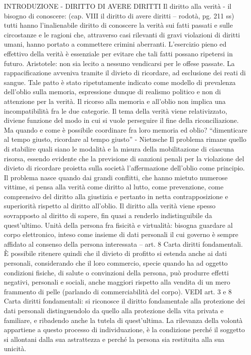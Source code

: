 {INTRODUZIONE - DIRITTO DI AVERE DIRITTI}
Il diritto alla verità - il bisogno di conoscere: (cap. VIII il diritto di avere diritti – rodotà, pg. 211 ss)
tutti hanno l’inalienabile diritto di conoscere la verità sui fatti passati e sulle circostanze e le ragioni che, attraverso casi rilevanti di gravi violazioni di diritti umani, hanno portato a commettere crimini aberranti. L’esercizio pieno ed effettivo della verità è essenziale per evitare che tali fatti possano ripetersi in futuro.
Aristotele: non sia lecito a nessuno vendicarsi per le offese passate. La rappacificazione avveniva tramite il divieto di ricordare, ad esclusione dei reati di sangue.
Tale patto è stato ripetutamente indicato come modello di prevalenza dell’oblio sulla memoria, espressione dunque di realismo politico e non di attenzione per la verità. Il ricorso alla memoria e all’oblio non implica una incompatibilità fra le due categorie. Il tema della verità viene relativizzato, diviene funzione del modo in cui si vuole perseguire il fine della riconciliazione. Ma quando e come è possibile coordinare fra loro memoria ed oblio?
“dimenticare al tempo giusto, ricordare al tempo giusto”  - Nietzsche
Il problema rimane quello di stabilire quali siano le modalità e la misura della mobilitazione di ciascuna risorsa, essendo evidente che la previsione di sanzioni penali per la violazione del divieto di ricordare proietta sulla società l’affermazione dell’oblio come principio.
Il problema nasce quando dai grandi conflitti, che hanno mietuto numerose vittime, si pensa alla verità come diritto al lutto, come prevenzione, come comprensivo del diritto alla giustizia e pertanto in netta contrapposizione e superiorità rispetto al diritto all’oblio. Il diritto alla verità viene spesso sovrapposto al diritto di sapere, fin quasi a renderlo indistinguibile da quest’ultimo. 
Unità della persona fra fisicità e virtualità:
bisogna guardare al corpo elettronico, inteso come insieme di dati personali il cui governo è sempre affidato al consenso della persona interessata – art. 8 Carta diritti fondamentali.
È possibile ritenere quindi che il divieto di profitto si estenda anche ai dati personali, considerando che il loro commercio, specie quando ha ad oggetto condizioni fisiche, di salute o convinzioni della persona, può produrre effetti negativi, personali e sociali, anche maggiori rispetto alla vendita di un mero frammento di pelle (parlando di commerciabilità del corpo).
VEDI art. 3 e 8 Carta diritti fondamentali:
si riconosce il diritto fondamentale alla protezione dei dati personali distinguendolo da quello alla protezione della vita privata e familiare, e ribadendo anche la tutela di quest’ultima. La rilevanza della volontà appartiene a questo processo di individuazione, è la condizione perché il soggetto si allontani dalla sua astrattezza e perché la persona sia restituita alla sua unicità.
